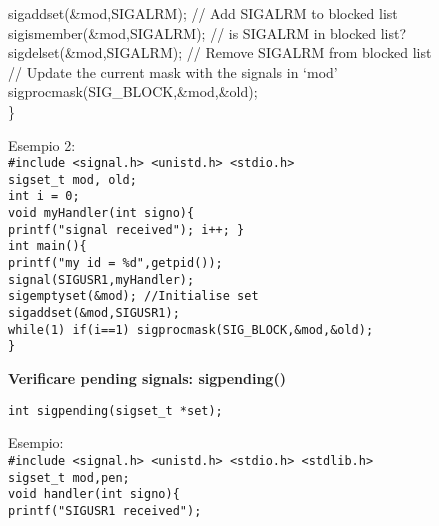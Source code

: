 \begin{flushleft}
\begin{flushleft}
\begin{flushleft}
\begin{flushleft}
{        \halftab sigaddset(\&mod,SIGALRM); // Add SIGALRM to blocked list\\
        \halftab sigismember(\&mod,SIGALRM); // is SIGALRM in blocked list?\\
        \halftab sigdelset(\&mod,SIGALRM); // Remove SIGALRM from blocked list\\
        \halftab // Update the current mask with the signals in ‘mod’\\
        \halftab sigprocmask(SIG\_BLOCK,\&mod,\&old);\\
        \}}
      \end{flushleft}
      \begin{flushleft}
        Esempio 2: \\
        \texttt{\#include <signal.h> <unistd.h> <stdio.h> \\
                sigset\_t mod, old;\\
                int i = 0;\\
                void myHandler(int signo)\{\\
                \halftab printf("signal received\n"); i++;
                \}\\
                int main()\{\\
                \halftab printf("my id = \%d\n",getpid());\\
                \halftab signal(SIGUSR1,myHandler);\\
                \halftab sigemptyset(\&mod); //Initialise set\\
                \halftab sigaddset(\&mod,SIGUSR1); \\
                \halftab while(1) if(i==1) sigprocmask(SIG\_BLOCK,\&mod,\&old);\\
                \}}
      \end{flushleft}
    \end{flushleft}
    \begin{flushleft}
      \textbf{Verificare pending signals: sigpending()}\par
      \texttt{int sigpending(sigset\_t *set);}\\
      \begin{flushleft}
        Esempio:\\
        \texttt{\#include <signal.h> <unistd.h> <stdio.h> <stdlib.h>\\
                sigset\_t mod,pen;\\
                void handler(int signo)\{ \\
                \halftab printf("SIGUSR1 received\n");\\
}
\end{flushleft}
\end{flushleft}
\end{flushleft}
\end{flushleft}
